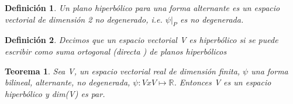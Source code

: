 \documentclass[12pt]{article}
\newtheorem{theorem}{Teorema}
\newtheorem{definition}{Definición}
\begin{document}
\begin{definition} 
 Un plano hiperbólico para una forma alternante es un espacio vectorial de dimensión 2 no degenerado,
  i.e. $\psi|_P$ es no degenerada. 
\end{definition}

\begin{definition}   
 Decimos que un espacio vectorial V es hiperbólico si se puede escribir como suma ortogonal (directa ) de
 planos hiperbólicos
\end{definition}

\begin{theorem} \label{Lang-8.1}
 Sea V, un espacio vectorial real de dimensión finita, $\psi$ una forma bilineal, alternante, no degenerada, 
 $\psi:VxV\mapsto \mathbb{R}$. Entonces V es un espacio hiperbólico y dim(V) es par.
\end{theorem}
\end{document}
